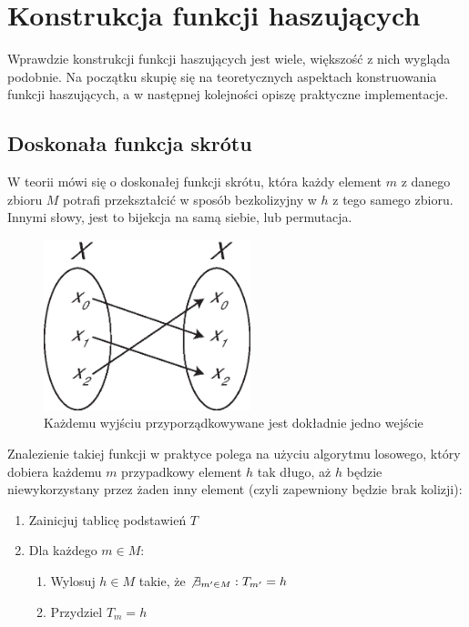 \documentclass[12pt,a4paper,twoside]{article}
\begin{document}
\section{Konstrukcja funkcji haszujących}
\label{sec:hash_construction}
Wprawdzie konstrukcji funkcji haszujących jest wiele, większość z nich wygląda
podobnie. Na początku skupię się na teoretycznych aspektach konstruowania
funkcji haszujących, a w następnej kolejności opiszę praktyczne implementacje.



\subsection{Doskonała funkcja skrótu}
W teorii mówi się o doskonałej funkcji skrótu, która każdy element $m$ z danego
zbioru $M$ potrafi przekształcić w sposób bezkolizyjny w $h$ z tego samego
zbioru. Innymi słowy, jest to bijekcja na samą siebie, lub permutacja.

\begin{figure}[htb!]
\includegraphics[width=6cm]{img/injection_self.eps}
\caption{Każdemu wyjściu przyporządkowywane jest dokładnie jedno wejście}
\label{fig:surjection}
\end{figure}


Znalezienie takiej funkcji w praktyce polega na użyciu algorytmu losowego,
który dobiera każdemu $m$ przypadkowy element $h$ tak długo, aż $h$ będzie
niewykorzystany przez żaden inny element (czyli zapewniony będzie brak
kolizji):

\begin{enumerate}
\item Zainicjuj tablicę podstawień $T$
\item Dla każdego $m \in M$:
    \begin{enumerate}[label*=\arabic*.]
        \item Wylosuj $h \in M$ takie, że $\not \exists_{m' \in M} : T_{m'} = h$
        \item Przydziel $T_m = h$
    \end{enumerate}
\end{enumerate}
\end{document}
